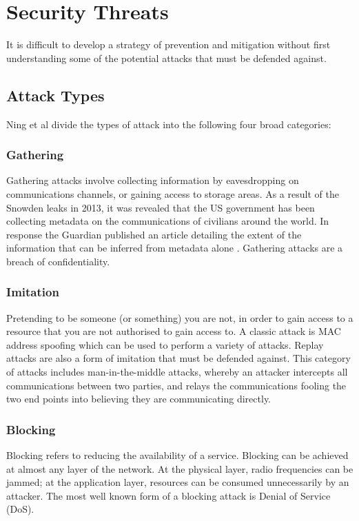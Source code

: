\documentclass[10pt,journal,compsoc]{IEEEtran}
\begin{document}
\section{Security Threats}
It is difficult to develop a strategy of prevention and mitigation without
first understanding some of the potential attacks that must be defended
against.  

\subsection{Attack Types}
Ning et al \cite{Ning2013} divide the types of attack into the following
four broad categories:

\subsubsection{Gathering}
Gathering attacks involve collecting information by eavesdropping on
communications channels, or gaining access to storage areas. As a result of the
Snowden leaks in 2013, it was revealed that the US government has been
collecting metadata on the communications of civilians around the world. In
response the Guardian published an article detailing the extent of the
information that can be inferred from metadata alone \cite{Guardian2013}.
Gathering attacks are a breach of confidentiality. 

\subsubsection{Imitation}
Pretending to be someone (or something) you are not, in order to gain access to
a resource that you are not authorised to gain access to. A classic attack is
MAC address spoofing which can be used to perform a variety of attacks. Replay
attacks are also a form of imitation that must be defended against. This
category of attacks includes man-in-the-middle attacks, whereby an attacker
intercepts all communications between two parties, and relays the
communications fooling the two end points into believing they are communicating
directly. 

\subsubsection{Blocking}
Blocking refers to reducing the availability of a service. Blocking can be
achieved at almost any layer of the network. At the physical layer, radio
frequencies can be jammed; at the application layer, resources can be consumed
unnecessarily by an attacker. The most well known form of a blocking attack is
Denial of Service (DoS). 
\end{document}
